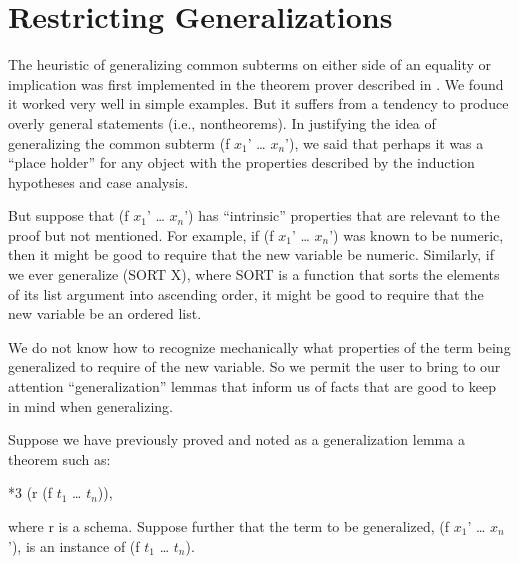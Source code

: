 \documentclass[10pt]{book}
\newenvironment{pubasis}{\begin{flushleft}}{\end{flushleft}}
\begin{document}
\section{Restricting Generalizations}
The heuristic of generalizing common subterms on either side of an
equality or implication was first implemented in the theorem prover
described in \cite{JACM}.  We found it worked very well in simple
examples.  But it suffers from a tendency to produce
overly general statements (i.e., nontheorems).  In justifying the
idea of generalizing the common subterm (f $x_{1}$' \ldots{} $x_{n}$'), we said that perhaps it
was  a ``place holder'' for any object with the properties
described by the induction hypotheses and case analysis.

But suppose that (f $x_{1}$' \ldots{} $x_{n}$') has ``intrinsic''
properties that are relevant to the proof but not mentioned.
For example, if (f $x_{1}$' \ldots{} $x_{n}$') was known to be numeric, then it might be good
to require that the new variable be numeric.  Similarly, if
we ever generalize (SORT X), where SORT is a function that sorts
the elements of its list argument into ascending order, it might
be good to require that the new variable be an ordered list.

We do not know how to recognize mechanically what
properties of the term being generalized to require
of the new variable.  So we permit the user to bring to
our attention ``generalization'' lemmas that inform us of facts
that are good to keep in mind when generalizing.

Suppose we have previously proved and noted as a generalization lemma a
theorem such as:
\begin{pubasis}
*3	(r (f $t_{1}$ \ldots{} $t_{n}$)),\\
\end{pubasis}
where r is a schema.
Suppose further that the term to be generalized, (f $x_{1}$' \ldots{} $x_{n}$'), is an
instance of  (f $t_{1}$ \ldots{} $t_{n}$).
\end{document}
